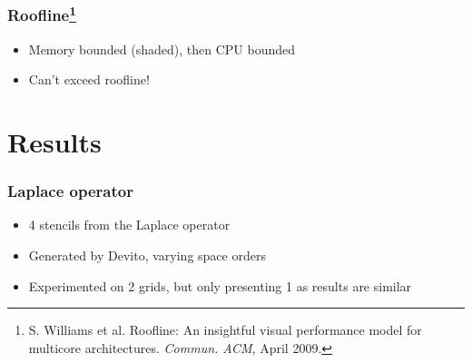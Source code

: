 \documentclass{beamer}
\begin{document}
\begin{frame}
\frametitle{Roofline\footnote{S. Williams et al. Roofline: An insightful visual performance model for multicore architectures. \emph{Commun. ACM}, April 2009.}}

\begin{center}
\end{center}

\begin{itemize}
	\item Memory bounded (shaded), then CPU bounded
	\item Can't exceed roofline!
\end{itemize}
\end{frame}



%



\section{Results}

\begin{frame}
\frametitle{Laplace operator}

\begin{itemize}
	\item 4 stencils from the Laplace operator
	\item Generated by Devito, varying space orders
	\item Experimented on 2 grids, but only presenting 1 as results are similar
\end{itemize}
\end{frame}
\end{document}

